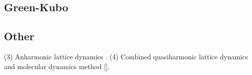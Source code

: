 

\subsection{Green-Kubo}

\subsection{Other}
(3) Anharmonic lattice dynamics \citep{Tang2009}. %
(4) Combined quasiharmonic lattice dynamics and molecular dynamics method [\citet{DeKoker2009}].

